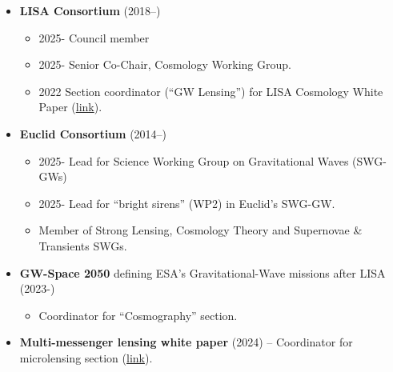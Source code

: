 \documentclass[11pt,a4paper]{article}
\begin{document}
\begin{itemize}

  \item \textbf{LISA Consortium} (2018--)
  \begin{itemize}
    \item 2025- Council member
    \item 2025- Senior Co-Chair, Cosmology Working Group.
    \item 2022 Section coordinator (``GW Lensing'') for LISA Cosmology White Paper (\href{https://inspirehep.net/literature/2066207}{link}).
  \end{itemize}

  \item \textbf{Euclid Consortium} (2014--)
  \begin{itemize}
    \item 2025- Lead for Science Working Group on Gravitational Waves (SWG-GWs)
    \item 2025- Lead for ``bright sirens'' (WP2) in Euclid's SWG-GW.
    \item Member of Strong Lensing, Cosmology Theory and Supernovae \& Transients SWGs.
  \end{itemize}
  \item \textbf{GW-Space 2050} defining ESA's Gravitational-Wave missions after LISA (2023-)
  \begin{itemize}
    \item Coordinator for ``Cosmography'' section.
  \end{itemize}
  \item \textbf{Multi-messenger lensing white paper} (2024) -- Coordinator for microlensing section (\href{https://inspirehep.net/literature/2904454}{link}).


\end{itemize}
\end{document}
